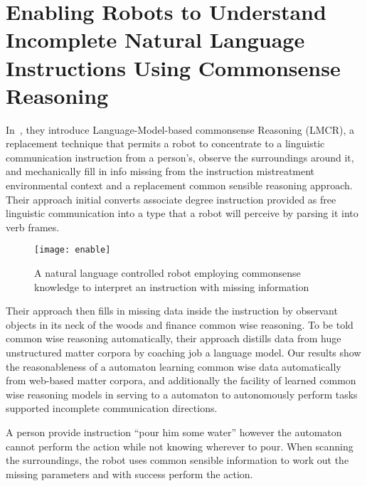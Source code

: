 \section{Enabling Robots to Understand Incomplete Natural Language Instructions Using Commonsense Reasoning}
In~\cite{DBLP:journals/corr/TesslerGZMM16}, they introduce Language-Model-based commonsense Reasoning (LMCR), a replacement technique that permits a robot to concentrate to a linguistic communication instruction from a person's, observe the surroundings around it, and mechanically fill in info missing from the instruction mistreatment environmental context and a replacement common sensible reasoning approach. Their approach initial converts associate degree instruction provided as free linguistic communication into a type that a robot will perceive by parsing it into verb frames.

\begin{figure}[htbp]
    
    \texttt{[image: enable]}
    \caption{A natural language controlled robot employing commonsense knowledge to interpret an instruction with missing information~\cite{DBLP:journals/corr/TesslerGZMM16} }
    \label{fig:enable}
\end{figure}
\newpage
Their approach then fills in missing data inside the instruction by observant objects in its neck of the woods and finance common wise reasoning. To be told common wise reasoning automatically, their approach distills data from huge unstructured matter corpora by coaching job a language model. Our results show the reasonableness of a automaton learning common wise data automatically from web-based matter corpora, and additionally the facility of learned common wise reasoning models in serving to a automaton to autonomously perform tasks supported incomplete communication directions.

A person provide instruction “pour him some water” however the automaton cannot perform the action while not knowing wherever to pour. When scanning the surroundings, the robot uses common sensible information to work out the missing parameters and with success perform the action.
